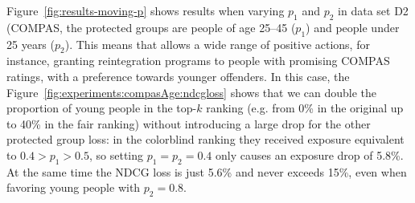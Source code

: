 Figure~\ref{fig:results-moving-p} shows results when varying $p_1$ and $p_2$ in data set D2 (COMPAS, the protected groups are people of age 25--45 ($p_1$) and people under 25 years ($p_2$).
%
This means that \algoFAIR allows a wide range of positive actions, for instance, granting reintegration programs to people with promising COMPAS ratings, with a preference towards younger offenders.
%
In this case, the Figure~\ref{fig:experiments:compasAge:ndcgloss} shows that we can double the proportion of young people in the top-$k$ ranking (e.g. from 0\% in the original up to 40\% in the fair ranking) without introducing a large drop for the other protected group loss: in the colorblind ranking they received exposure equivalent to $0.4 > p_1 > 0.5$, so setting $p_1 = p_2 = 0.4$ only causes an exposure drop of 5.8\%.
%
At the same time the NDCG loss is just 5.6\% and never exceeds 15\%, even when favoring young people with $p_2=0.8$.
